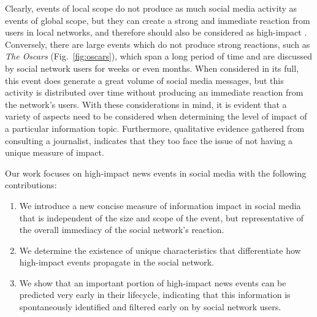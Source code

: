 \documentclass[10pt,letterpaper]{article}
\newcommand{\newtext}[1]{{\leavevmode\color{blue}#1}}
\begin{document}
Clearly, events of local scope do not produce as much social media
activity as events of global scope, but they can create a strong and
immediate reaction from users in local networks, and therefore should
also be considered as high-impact \cite{ReisBOPKA15}. Conversely,
there are large events which do not produce strong reactions, such as
{\em The Oscars} (Fig.~\ref{fig:oscars}), which span a long
period of time and are discussed by social network users for weeks or
even months. When considered in its full, this event does generate a
great volume of social media messages, but this activity is
distributed over time without producing an immediate reaction from the
network's users. With these considerations in mind, it is evident that
a variety of aspects need to be considered when determining the level
of impact of a particular information topic. Furthermore, qualitative
evidence gathered from consulting a journalist, indicates that they
too face the issue of not having a unique measure of impact.



\newtext{
Our work focuses on high-impact news events in social media
with the following contributions:
\begin{enumerate}
\item We introduce a new concise measure of information impact in social
media that is independent of the size and scope of the event, but
representative of the overall immediacy of the social network's reaction.
\item We determine the existence of unique characteristics that
differentiate how high-impact events propagate in the social network.
\item We show that an important portion of high-impact news events can be
predicted very early in their lifecycle, indicating that this information is
spontaneously identified and filtered early on by social network users.
\end{enumerate}
}

\end{document}
